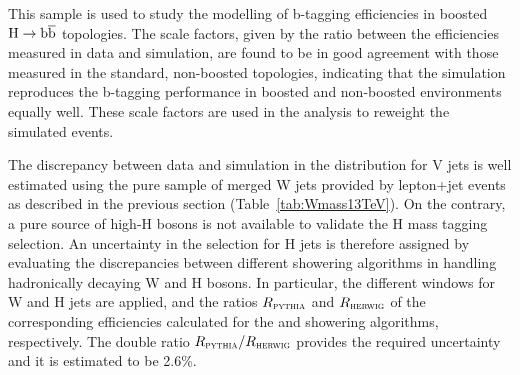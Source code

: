 This sample is used to study the modelling of b-tagging efficiencies in boosted $\mathrm{H}\to{\mathrm{b}\overline{\mathrm{b}}}$ topologies.
The scale factors, given by the ratio between the efficiencies measured in data and simulation, are
found to be in good agreement with those measured in the standard, non-boosted topologies,
indicating that the simulation reproduces the b-tagging performance in boosted and non-boosted environments equally well.
These scale factors are used in the analysis to reweight the simulated events.

The discrepancy between data and simulation in the \mJ distribution for V jets is well estimated 
using the pure sample of merged W jets provided by lepton+jet \ttbar events as described in the previous section (Table~\ref{tab:Wmass13TeV}).
On the contrary, a pure source of high-\pt H bosons is not available to validate the H mass tagging selection.
An uncertainty in the \mJ selection for H jets is therefore assigned by evaluating the discrepancies
between different showering algorithms in handling hadronically decaying W and H bosons.
In particular, the different \mJ windows for W and H jets are applied,
and the ratios $R_{\textsc{pythia}}{}$ and $R_{\textsc{herwig}}{}$ of the corresponding efficiencies calculated for the \PYTHIA{} and \HERWIG{} showering algorithms, respectively.
The double ratio $R_{\textsc{pythia}}{}/R_{\textsc{herwig}}{}$ provides the required uncertainty and it is estimated to be 2.6\%.

